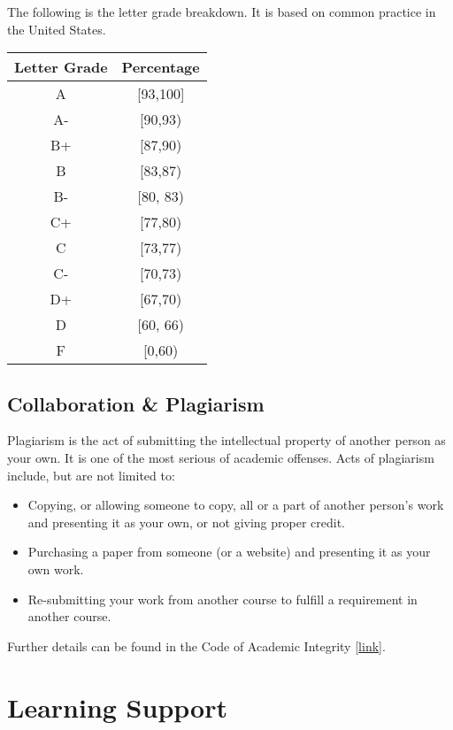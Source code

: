 \documentclass[
  openany]{book}
\begin{document}
The following is the letter grade breakdown. It is based on
common practice in the United States.

\begin{longtable}[]{@{}cc@{}}
\toprule\noalign{}
\textbf{Letter Grade} & \textbf{Percentage} \\
\midrule\noalign{}
\endhead
\bottomrule\noalign{}
\endlastfoot
A & {[}93,100{]} \\
A- & {[}90,93) \\
B+ & {[}87,90) \\
B & {[}83,87) \\
B- & {[}80, 83) \\
C+ & {[}77,80) \\
C & {[}73,77) \\
C- & {[}70,73) \\
D+ & {[}67,70) \\
D & {[}60, 66) \\
F & {[}0,60) \\
\end{longtable}

\subsection*{Collaboration \& Plagiarism}\label{collaboration-plagiarism}

Plagiarism is the act of submitting the intellectual property of another person as your own. It is one of the most serious of academic offenses. Acts of plagiarism include, but are not limited to:

\begin{itemize}
\item
  Copying, or allowing someone to copy, all or a part of another person's work and presenting it as your own, or not giving proper credit.
\item
  Purchasing a paper from someone (or a website) and presenting it as your own work.
\item
  Re-submitting your work from another course to fulfill a requirement in another course.
\end{itemize}

Further details can be found in the Code of Academic Integrity {[}\href{https://fulbright.edu.vn/articles/Code\%20of\%20Academic\%20Integrity/Code\%20of\%20Academic\%20Integrity_\%20Excom\%20Endorsed.pdf}{link}{]}.

\section*{Learning Support}\label{learning-support}
\end{document}
